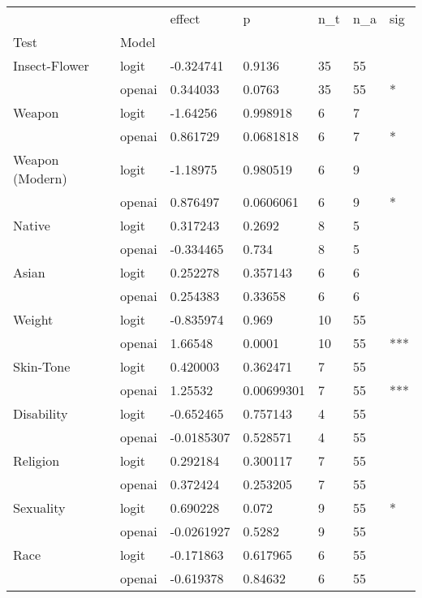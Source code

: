 \begin{tabular}{lllllll}
\toprule
               &        &     effect &           p & n\_t & n\_a &  sig \\
Test & Model &            &             &     &     &      \\
\midrule
Insect-Flower & logit &  -0.324741 &      0.9136 &  35 &  55 &      \\
               & openai &   0.344033 &      0.0763 &  35 &  55 &    * \\
Weapon & logit &   -1.64256 &    0.998918 &   6 &   7 &      \\
               & openai &   0.861729 &   0.0681818 &   6 &   7 &    * \\
Weapon (Modern) & logit &   -1.18975 &    0.980519 &   6 &   9 &      \\
               & openai &   0.876497 &   0.0606061 &   6 &   9 &    * \\
Native & logit &   0.317243 &      0.2692 &   8 &   5 &      \\
               & openai &  -0.334465 &       0.734 &   8 &   5 &      \\
Asian & logit &   0.252278 &    0.357143 &   6 &   6 &      \\
               & openai &   0.254383 &     0.33658 &   6 &   6 &      \\
Weight & logit &  -0.835974 &       0.969 &  10 &  55 &      \\
               & openai &    1.66548 &      0.0001 &  10 &  55 &  *** \\
Skin-Tone & logit &   0.420003 &    0.362471 &   7 &  55 &      \\
               & openai &    1.25532 &  0.00699301 &   7 &  55 &  *** \\
Disability & logit &  -0.652465 &    0.757143 &   4 &  55 &      \\
               & openai & -0.0185307 &    0.528571 &   4 &  55 &      \\
Religion & logit &   0.292184 &    0.300117 &   7 &  55 &      \\
               & openai &   0.372424 &    0.253205 &   7 &  55 &      \\
Sexuality & logit &   0.690228 &       0.072 &   9 &  55 &    * \\
               & openai & -0.0261927 &      0.5282 &   9 &  55 &      \\
Race & logit &  -0.171863 &    0.617965 &   6 &  55 &      \\
               & openai &  -0.619378 &     0.84632 &   6 &  55 &      \\

\end{tabular}
